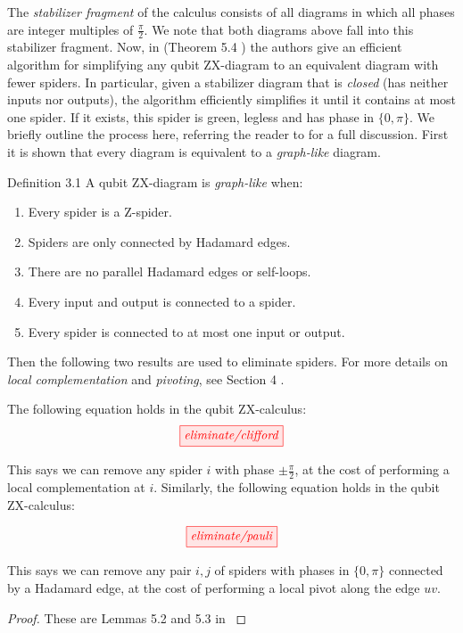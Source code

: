 \documentclass[submission,copyright,creativecommons]{eptcs}
\begin{document}
The \textit{stabilizer fragment} of the calculus consists of all diagrams in which all phases are integer multiples of $\frac{\pi}{2}$. We note that both diagrams above fall into this stabilizer fragment. Now, in (Theorem 5.4 \cite{graph_theoretic_simplification}) the authors give an efficient algorithm for simplifying any qubit ZX-diagram to an equivalent diagram with fewer spiders. In particular, given a stabilizer diagram that is \textit{closed} (has neither inputs nor outputs), the algorithm efficiently simplifies it until it contains at most one spider. If it exists, this spider is green, legless and has phase in $\{0, \pi\}$. We briefly outline the process here, referring the reader to \cite{graph_theoretic_simplification} for a full discussion. First it is shown that every diagram is equivalent to a \textit{graph-like} diagram.

\begin{definition}
	Definition 3.1 \cite{graph_theoretic_simplification} A qubit ZX-diagram is \textit{graph-like} when:
	\begin{enumerate}
		\item Every spider is a Z-spider.
		\item Spiders are only connected by Hadamard edges.
		\item There are no parallel Hadamard edges or self-loops.
		\item Every input and output is connected to a spider.
		\item Every spider is connected to at most one input or output.
	\end{enumerate}
\end{definition}

Then the following two results are used to eliminate spiders. For more details on \textit{local complementation} and \textit{pivoting}, see Section 4 \cite{graph_theoretic_simplification}. 

\begin{theorem}\label{thm:qubit_eliminate_spiders}
	The following equation holds in the qubit ZX-calculus:
	\begin{equation}\label{eq:eliminate_clifford}
		\tikzfig{eliminate/clifford}
	\end{equation}

	This says we can remove any spider $i$ with phase $\pm\frac{\pi}{2}$, at the cost of performing a local complementation at $i$. Similarly, the following equation holds in the qubit ZX-calculus:

	\begin{equation}\label{eq:eliminate_pauli}
		\tikzfig{eliminate/pauli}
	\end{equation}

	This says we can remove any pair $i, j$ of spiders with phases in $\{0, \pi\}$ connected by a Hadamard edge, at the cost of performing a local pivot along the edge $uv$. 

	\begin{proof}
		These are Lemmas 5.2 and 5.3 in \cite{graph_theoretic_simplification}
	\end{proof}
\end{theorem}
\end{document}
